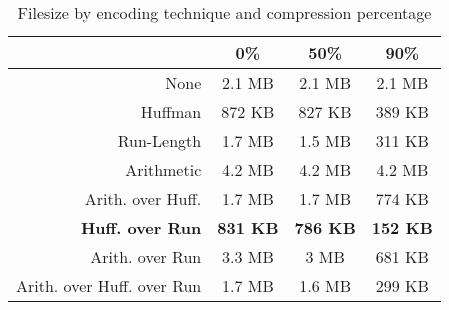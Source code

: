\documentclass[10pt,twocolumn,twoside]{IEEEtran}
\begin{document}
\begin{table}[htdp]
\caption{Filesize by encoding technique and compression percentage}
\vskip -15pt
\label{table:filesize}
\small{
\begin{center}
\begin{tabular}{|r|c|c|c|}
\hline
 & 0\%  & 50\% & 90\% \\
 \hline
 None & 2.1 MB & 2.1 MB & 2.1 MB\\
 \hline
 Huffman & 872 KB & 827 KB & 389 KB\\
 \hline
 Run-Length & 1.7 MB & 1.5 MB & 311 KB\\
 \hline
 Arithmetic & 4.2 MB & 4.2 MB & 4.2 MB\\
 \hline
 Arith. over Huff. & 1.7 MB & 1.7 MB & 774 KB\\
 \hline
 \textbf{Huff. over Run} & \textbf{831 KB} & \textbf{786 KB} & \textbf{152 KB}\\
 \hline
 Arith. over Run & 3.3 MB & 3 MB & 681 KB\\
 \hline
 Arith. over Huff. over Run & 1.7 MB & 1.6 MB & 299 KB\\
 \hline
\end{tabular}
\end{center}
}
\end{table}



\end{document}
